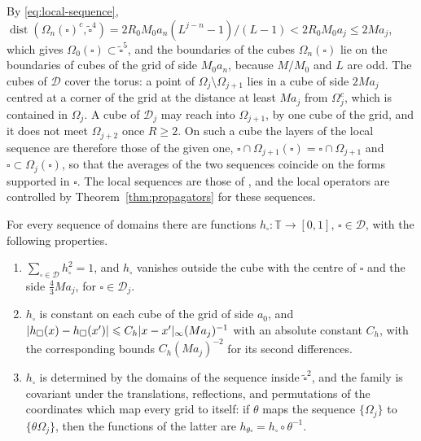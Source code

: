 \documentclass[11pt]{preprint}
\newcommand{\dist}{\operatorname{dist}}
\DeclarePairedDelimiter{\abs}{\lvert}{\rvert}
\numberwithin{equation}{section}
\begin{document}
By \eqref{eq:local-sequence}, $\dist(\Omega_n(\square)^c, \tilde\square^4) = 2R_0M_0a_n(L^{j-n} - 1)/(L - 1) < 2R_0M_0a_j \leqslant 2Ma_j$, which gives $\Omega_0(\square) \subset \tilde\square^5$, and the boundaries of the cubes $\Omega_n(\square)$ lie on the boundaries of cubes of the grid of side $M_0a_n$, because $M/M_0$ and $L$ are odd. The cubes of $\mathscr D$ cover the torus: a point of $\Omega_j \setminus \Omega_{j+1}$ lies in a cube of side $2Ma_j$ centred at a corner of the grid at the distance at least $Ma_j$ from $\Omega_j^c$, which is contained in $\Omega_j$. A cube of $\mathscr D_j$ may reach into $\Omega_{j+1}$, by one cube of the grid, and it does not meet $\Omega_{j+2}$ once $R \geqslant 2$. On such a cube the layers of the local sequence are therefore those of the given one, $\square \cap \Omega_{j+1}(\square) = \square \cap \Omega_{j+1}$ and $\square \subset \Omega_j(\square)$, so that the averages of the two sequences coincide on the forms supported in $\square$. The local sequences are those of \cite[p.~408]{BalabanPBG}, and the local operators are controlled by Theorem~\ref{thm:propagators} for these sequences.

\begin{lemma}\label{lem:partition-of-unity}
For every sequence of domains there are functions $h_\square \colon \mathbb T \to [0, 1]$, $\square \in \mathscr D$, with the following properties.
\begin{enumerate}[label=(\roman*)]
\item $\sum_{\square \in \mathscr D}h_\square^2 = 1$, and $h_\square$ vanishes outside the cube with the centre of $\square$ and the side $\frac{4}{3}Ma_j$, for $\square \in \mathscr D_j$.
\item $h_\square$ is constant on each cube of the grid of side $a_0$, and $\abs{h_\square(x) - h_\square(x')} \leqslant C_h\abs{x - x'}_\infty(Ma_j)^{-1}$ with an absolute constant $C_h$, with the corresponding bounds $C_h(Ma_j)^{-2}$ for its second differences.
\item $h_\square$ is determined by the domains of the sequence inside $\tilde\square^2$, and the family is covariant under the translations, reflections, and permutations of the coordinates which map every grid to itself: if $\theta$ maps the sequence $\{ \Omega_j \}$ to $\{ \theta\Omega_j \}$, then the functions of the latter are $h_{\theta\square} = h_\square \circ \theta^{-1}$.
\end{enumerate}
\end{lemma}
\end{document}
